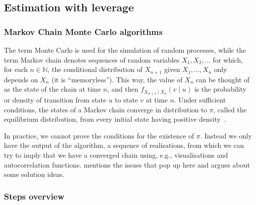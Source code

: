 \subsection{Estimation with leverage}\label{sec:estimlev}

\subsubsection[MCMC algorithms]{Markov Chain Monte Carlo algorithms}

The term Monte Carlo is used for the simulation of random processes, while the term Markov chain denotes sequences of random variables $X_1,X_2,\dots$ for which, for each $n\in\mathbb{N}$, the conditional distribution of $X_{n+1}$ given $X_1,\dots,X_n$ only depends on $X_n$ (it is ``memoryless'').
This way, the value of $X_n$ can be thought of as the state of the chain at time $n$, and then $f_{X_{n+1}\mid X_n}(v\mid u)$ is the probability or density of transition from state $u$ to state $v$ at time $n$.
Under sufficient conditions, the states of a Markov chain converge in distribution to $\pi$, called the equilibrium distribution, from every initial state having positive density~\citep{grinstead2012introduction}.

In practice, we cannot prove the conditions for the existence of $\pi$.
Instead we only have the output of the algorithm, a sequence of realisations, from which we can try to imply that we have a converged chain using, e.g., visualisations and autocorrelation functions.
\citet{Geyer2011} mentions the issues that pop up here and argues about some solution ideas.


\subsubsection{Steps overview}


